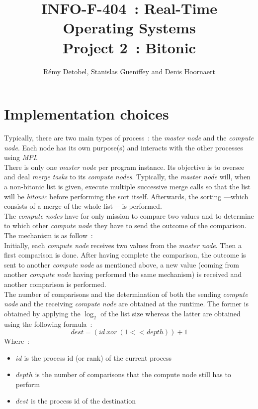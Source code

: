 \documentclass[a4paper,11pt]{article}
\title{INFO-F-404~: Real-Time Operating Systems\\Project 2~: Bitonic}
\author{Rémy Detobel, Stanislas Gueniffey and Denis Hoornaert}
\begin{document}
\maketitle

\section{Implementation choices}

  Typically, there are two main types of process~: the \textit{master node} and the \textit{compute node}. Each node has its own purpose(s) and interacts with the other processes using \textit{MPI}.\\
  
  \noindent There is only one \textit{master node} per program instance. Its objective is to oversee and deal \textit{merge tasks} to its \textit{compute nodes}. Typically, the \textit{master node} will, when a non-bitonic list is given, execute multiple successive merge calls so that the list will be \textit{bitonic} before performing the sort itself. Afterwards, the sorting  ---which consists of a merge of the whole list--- is performed.\\
  
  \noindent The \textit{compute nodes} have for only mission to compare two values and to determine to which other \textit{compute node} they have to send the outcome of the comparison. The mechanism is as follow~:\\
  Initially, each \textit{compute node} receives two values from the \textit{master node}. Then a first comparison is done. After having complete the comparison, the outcome is sent to another \textit{compute node} as mentioned above, a new value (coming from another \textit{compute node} having performed the same mechanism) is received and another comparison is performed.\\
  The number of comparisons and the determination of both the sending \textit{compute node} and the receiving \textit{compute node} are obtained at the runtime. The former is obtained by applying the $\log_{2}$ of the list size whereas the latter are obtained using the following formula~:
  \[dest = (id~xor~(1 << depth)) + 1\]
  Where~:
  \begin{itemize}
    \item $id$ is the process id (or rank) of the current process
    \item $depth$ is the number of comparisons that the compute node still has to perform
    \item $dest$ is the process id of the destination
  \end{itemize}
\end{document}
